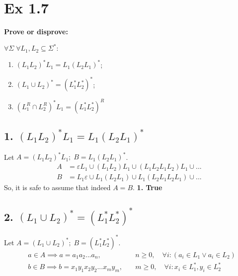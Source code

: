 
\section*{Ex 1.7}
\begin{mdframed}
	\textbf{Prove or disprove:}

    $\forall \Sigma \;\forall L_1, L_2 \subseteq \Sigma^*:$
	\begin{enumerate}
        \item $(L_1 L_2)^* L_1 = L_1 (L_2 L_1)^*$;
        \item $(L_1 \cup L_2)^*  = (L_1^* L_2^*)^*$;
        \item $(L_1^R \cap L_2^R)^* L_1 = (L_1^* L_2^*)^R$
    \end{enumerate}
\end{mdframed}

\subsection*{1. $ (L_1 L_2)^* L_1 = L_1 (L_2 L_1)^* $}
Let $A = (L_1 L_2)^* L_1;\; B = L_1 (L_2 L_1)^*$.
\begin{align*}
    A & = \varepsilon L_1 \cup (L_1 L_2) L_1 \cup (L_1 L_2 L_1 L_2) L_1 \cup ... \\
    B & = L_1 \varepsilon \cup L_1 (L_2 L_1) \cup L_1 (L_2 L_1 L_2 L_1) \cup ...
\end{align*}
So, it is safe to assume that indeed $A = B$. \quad  \qedsymbol
\quad \textbf{\large 1. True}

\subsection*{2. $(L_1 \cup L_2)^*  = (L_1^* L_2^*)^*$}
Let $A = (L_1 \cup L_2)^*;\; B = (L_1^* L_2^*)^*$.
\begin{align*}
    & a \in A \implies a = a_1 a_2 ... a_n ,\quad & n \ge 0,
    \quad \forall i : (a_i \in L_1 \vee a_i \in L_2) \\
    & b \in B \implies b = x_1 y_1 x_2 y_2 ... x_m y_m ,\quad & m \ge 0,
    \quad \forall i : x_i \in L_1^*, y_i \in L_2^* 
\end{align*}

